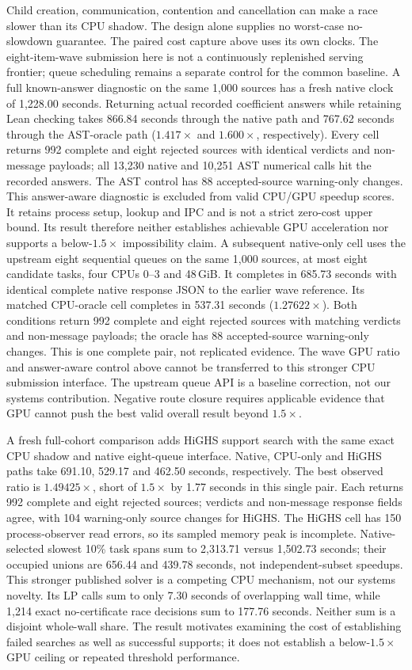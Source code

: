 \documentclass[10pt,twocolumn]{article}
\begin{document}
Child creation, communication, contention and cancellation can make a race
slower than its CPU shadow. The design alone supplies no worst-case
no-slowdown guarantee. The paired cost capture above uses its own clocks. The eight-item-wave
submission here is not a continuously replenished serving frontier;
queue scheduling remains a separate control for the common baseline.
A full known-answer diagnostic on the same 1,000 sources has a fresh native
clock of 1,228.00 seconds. Returning actual recorded coefficient answers
while retaining Lean checking takes 866.84 seconds through the native path
and 767.62 seconds through the AST-oracle path
($1.417\times$ and $1.600\times$, respectively).
Every cell returns 992 complete and eight rejected sources with identical
verdicts and non-message payloads; all 13,230 native and 10,251 AST
numerical calls hit the recorded answers.
The AST control has 88 accepted-source warning-only changes.
This answer-aware diagnostic is excluded from valid CPU/GPU speedup scores.
It retains process setup, lookup and IPC and is not a strict zero-cost
upper bound. Its result therefore neither establishes achievable GPU
acceleration nor supports a below-$1.5\times$ impossibility claim.
A subsequent native-only cell uses the upstream eight sequential queues
on the same 1,000 sources, at most eight candidate tasks, four CPUs 0--3
and 48\,GiB. It completes in 685.73 seconds with identical complete
native response JSON to the earlier wave reference. Its matched CPU-oracle cell completes in 537.31 seconds ($1.27622\times$).
Both conditions return 992 complete and eight rejected sources with matching
verdicts and non-message payloads; the oracle has 88 accepted-source
warning-only changes. This is one complete pair, not replicated evidence. The wave GPU ratio and answer-aware control above
cannot be transferred to this stronger CPU submission interface.
The upstream queue API is a baseline correction, not our systems contribution.
Negative route closure requires applicable evidence that GPU cannot
push the best valid overall result beyond $1.5\times$.

A fresh full-cohort comparison adds HiGHS support search with the
same exact CPU shadow and native eight-queue interface. Native, CPU-only and
HiGHS paths take 691.10, 529.17 and 462.50 seconds, respectively. The best
observed ratio is $1.49425\times$, short of $1.5\times$ by 1.77 seconds in
this single pair. Each returns 992 complete and eight rejected sources;
verdicts and non-message response fields agree, with 104 warning-only source
changes for HiGHS. The HiGHS cell has 150 process-observer read errors, so
its sampled memory peak is incomplete. Native-selected slowest 10\% task
spans sum to 2,313.71 versus 1,502.73 seconds; their occupied unions are
656.44 and 439.78 seconds, not independent-subset speedups.
This stronger published solver is a competing CPU mechanism, not our systems
novelty. Its LP calls sum to only 7.30 seconds of overlapping wall time,
while 1,214 exact no-certificate race decisions sum to 177.76 seconds.
Neither sum is a disjoint whole-wall share. The result motivates examining
the cost of establishing failed searches as well as successful supports;
it does not establish a below-$1.5\times$ GPU ceiling or repeated threshold
performance.
\end{document}
